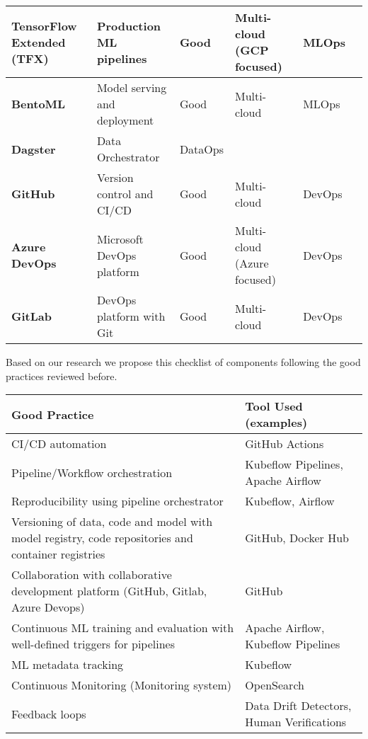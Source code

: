 \begin{longtable}{|p{2cm}|p{3.5cm}|p{2cm}|p{2cm}|p{1.5cm}|p{1.5cm}|}
    \textbf{TensorFlow Extended (TFX)} & Production ML pipelines & Good & Multi-cloud (GCP focused) & MLOps & \cite{Kreuzberger2022MachineLO} \\
    \hline

    \textbf{BentoML} & Model serving and deployment & Good & Multi-cloud & MLOps & \cite{9792270,BURGUENOROMERO2025107499,mlops-definition-tools-and-challenge} \\
    \hline

    \textbf{Dagster} & Data Orchestrator & DataOps & \cite{landscape} \\
    \hline

    \textbf{GitHub} & Version control and CI/CD & Good & Multi-cloud & DevOps & \cite{10.1145/3533378m, mlops-gitops, ...} \\
    \hline

    \textbf{Azure DevOps} & Microsoft DevOps platform & Good & Multi-cloud (Azure focused) & DevOps & \cite{Kreuzberger2022MachineLO,gift2021practical} \\
    \hline

    \textbf{GitLab} & DevOps platform with Git & Good & Multi-cloud & DevOps & \cite{9792270} \\
    \hline

\end{longtable}
\normalsize


Based on our research we propose this checklist of components following the good practices reviewed before.
\footnotesize
\begin{longtable}{|p{7cm}|p{6cm}|}
    \hline
    \textbf{Good Practice} & \textbf{Tool Used (examples)} \\
    \hline
    CI/CD automation & GitHub Actions\\
    \hline
    Pipeline/Workflow orchestration & Kubeflow Pipelines, Apache Airflow\\
    \hline
    Reproducibility using pipeline orchestrator & Kubeflow, Airflow \\
    \hline
    Versioning of data, code and model with model registry, code repositories and container registries & GitHub, Docker Hub \\
    \hline
    Collaboration with collaborative development platform (GitHub, Gitlab, Azure Devops) & GitHub \\
    \hline
    Continuous ML training and evaluation with well-defined triggers for pipelines & Apache Airflow, Kubeflow Pipelines\\
    \hline
    ML metadata tracking & Kubeflow \\
    \hline
    Continuous Monitoring (Monitoring system) & OpenSearch \\
    \hline
    Feedback loops & Data Drift Detectors, Human Verifications \\
    \hline
\end{longtable}
\normalsize